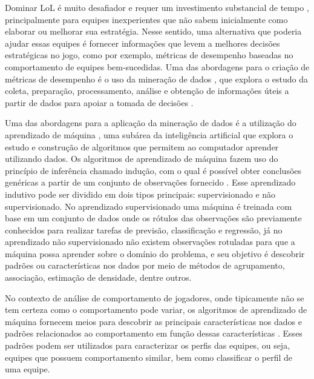 Dominar LoL é muito desafiador e requer um investimento substancial de tempo \cite{drachen2014skill}, principalmente para equipes inexperientes que não sabem inicialmente como elaborar ou melhorar sua estratégia. Nesse sentido, uma alternativa que poderia ajudar essas equipes é fornecer informações que levem a melhores decisões estratégicas no jogo, como por exemplo, métricas de desempenho baseadas no comportamento de equipes bem-sucedidas. Uma das abordagens para o criação de métricas de desempenho é o uso da mineração de dados \cite{el2016game}, que explora o estudo da coleta, preparação, processamento, análise e obtenção de informações úteis a partir de dados para apoiar a tomada de decisões \cite{aggarwal2015data}.

Uma das abordagens para a aplicação da mineração de dados é a utilização do aprendizado de máquina \cite{aggarwal2015data}, uma subárea da inteligência artificial que explora o estudo e construção de algoritmos que permitem ao computador aprender utilizando dados. Os algoritmos de aprendizado de máquina fazem uso do princípio de inferência chamado indução, com o qual é possível obter conclusões genéricas a partir de um conjunto de observações fornecido \cite{lorena2007introduccao}. Esse aprendizado indutivo pode ser dividido em dois tipos principais: supervisionado e não supervisionado. No aprendizado supervisionado uma máquina é treinada com base em um conjunto de dados onde os rótulos das observações são previamente conhecidos para realizar tarefas de previsão, classificação e regressão, já no aprendizado não supervisionado não existem observações rotuladas para que a máquina possa aprender sobre o domínio do problema, e seu objetivo é descobrir padrões ou características nos dados \cite{sathya2013comparison} por meio de métodos de agrupamento, associação, estimação de densidade, dentre outros.

No contexto de análise de comportamento de jogadores, onde tipicamente não se tem certeza como o comportamento pode variar, os algoritmos de aprendizado de máquina fornecem meios para descobrir as principais características nos dados e padrões relacionados ao comportamento em função dessas características \cite{el2016game}. Esses padrões podem ser utilizados para caracterizar os perfis das equipes, ou seja, equipes que possuem comportamento similar, bem como classificar o perfil de uma equipe.

